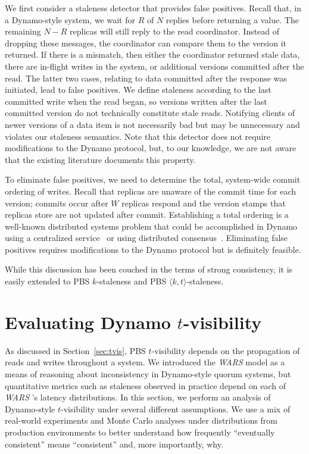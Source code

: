 \documentclass{vldb}
\begin{document}
We first consider a staleness detector that provides false positives.
Recall that, in a Dynamo-style system, we wait for $R$ of $N$ replies
before returning a value.  The remaining $N-R$ replicas will still
reply to the read coordinator.  Instead of dropping these messages,
the coordinator can compare them to the version it returned.  If there
is a mismatch, then either the coordinator returned stale data, there
are in-flight writes in the system, or additional versions committed
after the read. The latter two cases, relating to data committed after
the response was initiated, lead to false positives.  We define
staleness according to the last committed write when the read began,
so versions written after the last committed version do not
technically constitute stale reads.  Notifying clients of newer
versions of a data item is not necessarily bad but may be unnecessary
and violates our staleness semantics.  Note that this detector does
not require modifications to the Dynamo protocol, but, to our
knowledge, we are not aware that the existing literature documents
this property.

To eliminate false positives, we need to determine the total,
system-wide commit ordering of writes. Recall that replicas are
unaware of the commit time for each version; commits occur after $W$
replicas respond and the version stamps that replicas store are not
updated after commit.  Establishing a total ordering is a well-known
distributed systems problem that could be accomplished in Dynamo using
a centralized service~\cite{zookeeper} or using distributed
consensus~\cite{paxos}.  Eliminating false positives requires
modifications to the Dynamo protocol but is definitely feasible.

While this discussion has been couched in the terms of strong
consistency, it is easily extended to PBS $k$-staleness and PBS
$\langle k, t \rangle$-staleness.

\section{Evaluating Dynamo $t$-visibility}
\label{sec:dynamoeval}

As discussed in Section~\ref{sec:tvis}, PBS $t$-visibility depends on
the propagation of reads and writes throughout a system.  We
introduced the \textit{WARS}  model as a means of reasoning about
inconsistency in Dynamo-style quorum systems, but quantitative metrics
such as staleness observed in practice depend on each of \textit{WARS} 's
latency distributions.  In this section, we perform an analysis of
Dynamo-style $t$-visibility under several different assumptions.  We
use a mix of real-world experiments and Monte Carlo analyses
under distributions from production environments to better
understand how frequently ``eventually consistent'' means
``consistent'' and, more importantly, why.
\end{document}
